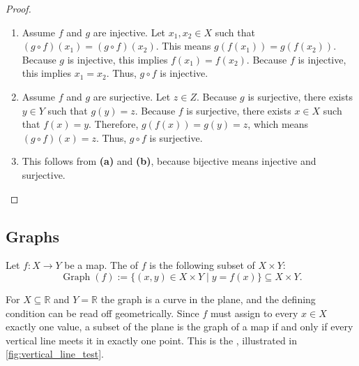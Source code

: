 \begin{proof}
\begin{enumerate}[label=\textbf{(\alph*)}]
    \item Assume $f$ and $g$ are injective. Let $x_1, x_2 \in X$ such that $(g \circ f)(x_1) = (g \circ f)(x_2)$. This means $g(f(x_1)) = g(f(x_2))$. Because $g$ is injective, this implies $f(x_1) = f(x_2)$. Because $f$ is injective, this implies $x_1 = x_2$. Thus, $g \circ f$ is injective.
    \item Assume $f$ and $g$ are surjective. Let $z \in Z$. Because $g$ is surjective, there exists $y \in Y$ such that $g(y) = z$. Because $f$ is surjective, there exists $x \in X$ such that $f(x) = y$. Therefore, $g(f(x)) = g(y) = z$, which means $(g \circ f)(x) = z$. Thus, $g \circ f$ is surjective.
    \item This follows from \textbf{(a)} and \textbf{(b)}, because bijective means injective and surjective.
\end{enumerate}
\end{proof}

\subsection{Graphs}

\begin{definition}
\label{def:graph_of_map}
Let $f: X \to Y$ be a map. The  of $f$ is the following subset of $X \times Y$:
\[
\operatorname{Graph}(f) := \{(x,y) \in X \times Y \mid y = f(x)\} \subseteq X \times Y .
\]
\end{definition}

For $X \subseteq \mathbb{R}$ and $Y = \mathbb{R}$ the graph is a curve in the plane, and the defining condition can be read off geometrically. Since $f$ must assign to every $x \in X$ exactly one value, a subset of the plane is the graph of a map if and only if every vertical line meets it in exactly one point. This is the , illustrated in \cref{fig:vertical_line_test}.

